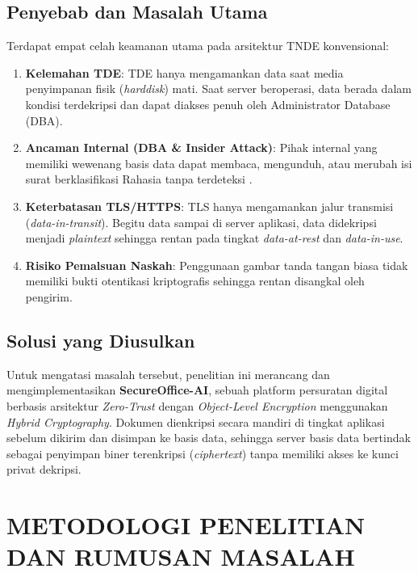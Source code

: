 \documentclass[conference]{IEEEtran}
\begin{document}
\subsection{Penyebab dan Masalah Utama}
Terdapat empat celah keamanan utama pada arsitektur TNDE konvensional:
\begin{enumerate}
    \item \textbf{Kelemahan TDE}: TDE hanya mengamankan data saat media penyimpanan fisik (\textit{harddisk}) mati. Saat server beroperasi, data berada dalam kondisi terdekripsi dan dapat diakses penuh oleh Administrator Database (DBA).
    \item \textbf{Ancaman Internal (DBA \& Insider Attack)}: Pihak internal yang memiliki wewenang basis data dapat membaca, mengunduh, atau merubah isi surat berklasifikasi Rahasia tanpa terdeteksi \cite{tdsc2023reks}.
    \item \textbf{Keterbatasan TLS/HTTPS}: TLS hanya mengamankan jalur transmisi (\textit{data-in-transit}). Begitu data sampai di server aplikasi, data didekripsi menjadi \textit{plaintext} sehingga rentan pada tingkat \textit{data-at-rest} dan \textit{data-in-use}.
    \item \textbf{Risiko Pemalsuan Naskah}: Penggunaan gambar tanda tangan biasa tidak memiliki bukti otentikasi kriptografis sehingga rentan disangkal oleh pengirim.
\end{enumerate}

\subsection{Solusi yang Diusulkan}
Untuk mengatasi masalah tersebut, penelitian ini merancang dan mengimplementasikan \textbf{SecureOffice-AI}, sebuah platform persuratan digital berbasis arsitektur \textit{Zero-Trust} dengan \textit{Object-Level Encryption} menggunakan \textit{Hybrid Cryptography}. Dokumen dienkripsi secara mandiri di tingkat aplikasi sebelum dikirim dan disimpan ke basis data, sehingga server basis data bertindak sebagai penyimpan biner terenkripsi (\textit{ciphertext}) tanpa memiliki akses ke kunci privat dekripsi.

\section{METODOLOGI PENELITIAN DAN RUMUSAN MASALAH}
\end{document}
